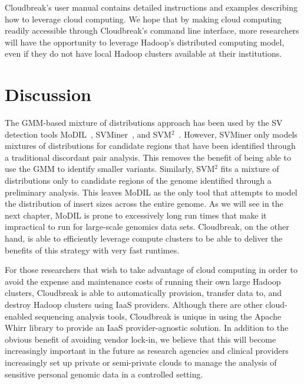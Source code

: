 Cloudbreak's user manual contains detailed instructions and examples describing how to leverage cloud computing. We hope that by making cloud computing readily accessible through Cloudbreak's command line interface, more researchers will have the opportunity to leverage Hadoop's distributed computing model, even if they do not have local Hadoop clusters available at their institutions.

\section{Discussion}

The GMM-based mixture of distributions approach has been used by the SV detection tools MoDIL~\cite{Lee:2009da}, SVMiner~\cite{Hayes:2012ia}, and SVM$^2$~\cite{Chiara:2012ey}. However, SVMiner only models mixtures of distributions for candidate regions that have been identified through a traditional discordant pair analysis. This removes the benefit of being able to use the GMM to identify smaller variants. Similarly, SVM$^2$ fits a mixture of distributions only to candidate regions of the genome identified through a preliminary analysis. This leaves MoDIL as the only tool that attempts to model the distribution of insert sizes across the entire genome. As we will see in the next chapter, MoDIL is prone to excessively long run times that make it impractical to run for large-scale genomics data sets. Cloudbreak, on the other hand, is able to efficiently leverage compute clusters to be able to deliver the benefits of this strategy with very fast runtimes.

For those researchers that wish to take advantage of cloud computing in order to avoid the expense and maintenance costs of running their own large Hadoop clusters, Cloudbreak is able to automatically provision, transfer data to, and destroy Hadoop clusters using IaaS providers. Although there are other cloud-enabled sequencing analysis tools, Cloudbreak is unique in using the Apache Whirr library to provide an IaaS provider-agnostic solution. In addition to the obvious benefit of avoiding vendor lock-in, we believe that this will become increasingly important in the future as research agencies and clinical providers increasingly set up private or semi-private clouds to manage the analysis of sensitive personal genomic data in a controlled setting.